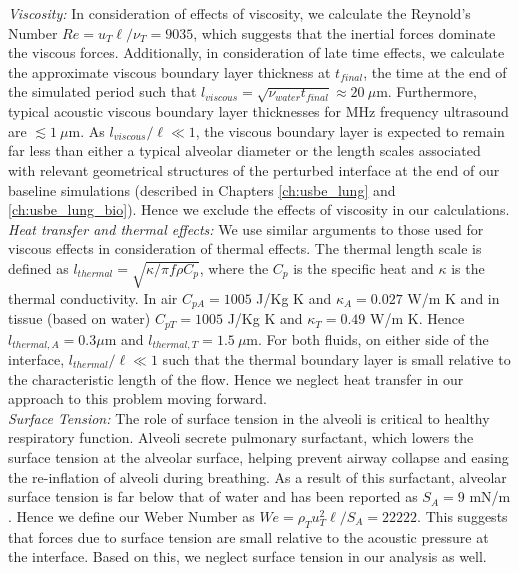 \noindent\textit{Viscosity:} In consideration of effects of viscosity, we calculate the Reynold's Number $Re = u_T \ell / \nu_T = 9035$, which suggests that the inertial forces dominate the viscous forces. Additionally, in consideration of late time effects, we calculate
the approximate viscous boundary layer thickness at $t_{final}$, the
time at the end of the simulated period such that
$l_{viscous}=\sqrt{\nu_{water} t_{final}} \approx
20~\mu$m. Furthermore, typical acoustic viscous boundary layer
thicknesses for MHz frequency ultrasound are $\lesssim1~\mu$m. As
$l_{viscous}/\ell\ll1$, the viscous boundary layer is expected to
remain far less than either a typical alveolar diameter or the length
scales associated with relevant geometrical structures of the
perturbed interface at the end of our baseline simulations (described
in Chapters \ref{ch:usbe_lung} and \ref{ch:usbe_lung_bio}). Hence we
exclude the effects of viscosity in our calculations.\\

\noindent\textit{Heat transfer and thermal effects:} We use similar arguments to
those used for viscous effects in consideration of thermal
effects. The thermal length scale is defined as
$l_{thermal}=\sqrt{\kappa/\pi f \rho C_p}$, where the $C_p$ is the
specific heat and $\kappa$ is the thermal conductivity. In air
$C_{pA}=1005$ J/Kg K and $\kappa_A=0.027$ W/m K and in tissue (based
on water) $C_{pT}=1005$ J/Kg K and $\kappa_T=0.49$ W/m K. Hence
$l_{thermal,A} = 0.3 \mu$m and $l_{thermal,T} = 1.5~\mu$m. For
both fluids, on either side of the interface, $l_{thermal}/\ell \ll 1$
such that the thermal boundary layer is small relative to the
characteristic length of the flow. Hence we neglect heat transfer in
our approach to this problem moving forward.\\

\noindent\textit{Surface Tension:} The role of surface tension in the alveoli
is critical to healthy respiratory function. Alveoli secrete pulmonary
surfactant, which lowers the surface tension at the alveolar surface,
helping prevent airway collapse and easing the re-inflation of alveoli
during breathing. As a result of this surfactant, alveolar surface
tension is far below that of water and has been reported as $S_A = 9$
mN/m \citep{Schurch1976}. Hence we define our Weber Number as
$We = \rho_T u_T^2 \ell/S_A = 22222$. This suggests that forces due to
surface tension are small relative to the acoustic pressure at the
interface. Based on this, we neglect surface tension in our
analysis as well.\\

